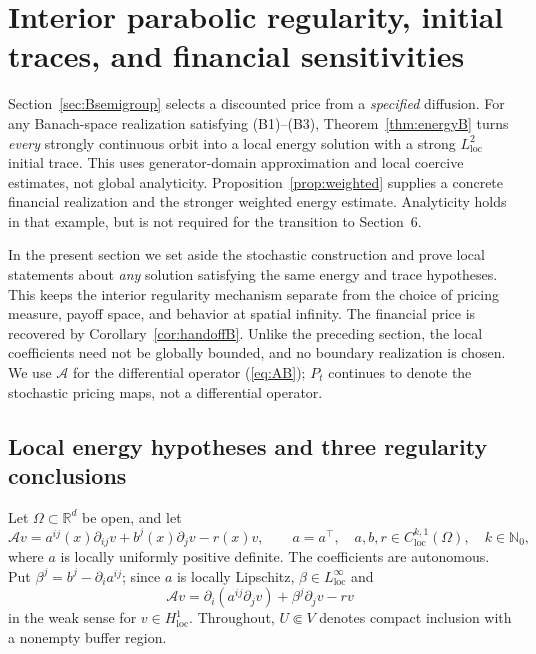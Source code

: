 \documentclass[11pt,a4paper]{article}
\theoremstyle{definition}\newtheorem{definition}{Definition}[section]\newtheorem{example}[theorem]{Example}
\theoremstyle{remark}\newtheorem{remark}[theorem]{Remark}\newtheorem{remarkSix}{Remark}[section]
\newcommand{\Rd}{\mathbb R^d}
\newcommand{\loc}{\mathrm{loc}}
\newcommand{\cA}{\mathcal A}
\begin{document}
\clearpage
\section{Interior parabolic regularity, initial traces, and financial sensitivities}
\label{sec:interior6}

Section~\ref{sec:Bsemigroup} selects a discounted price from a \emph{specified} diffusion. For any Banach-space realization satisfying (B1)--(B3), Theorem~\ref{thm:energyB} turns \emph{every} strongly continuous orbit into a local energy solution with a strong $L^2_{\loc}$ initial trace. This uses generator-domain approximation and local coercive estimates, not global analyticity. Proposition~\ref{prop:weighted} supplies a concrete financial realization and the stronger weighted energy estimate. Analyticity holds in that example, but is not required for the transition to Section~6.

In the present section we set aside the stochastic construction and prove local statements about \emph{any} solution satisfying the same energy and trace hypotheses. This keeps the interior regularity mechanism separate from the choice of pricing measure, payoff space, and behavior at spatial infinity. The financial price is recovered by Corollary~\ref{cor:handoffB}. Unlike the preceding section, the local coefficients need not be globally bounded, and no boundary realization is chosen. We use $\cA$ for the differential operator (\ref{eq:AB}); $P_t$ continues to denote the stochastic pricing maps, not a differential operator.

\subsection{Local energy hypotheses and three regularity conclusions}
\label{subsec:three6}
Let $\Omega\subset\Rd$ be open, and let
\begin{equation}\label{eq:localoperator6}
 \cA v=a^{ij}(x)\partial_{ij}v+b^j(x)\partial_jv-r(x)v,
 \qquad a=a^\top,\quad
 a,b,r\in C^{k,1}_{\loc}(\Omega),\quad k\in\mathbb N_0,
\end{equation}
where $a$ is locally uniformly positive definite. The coefficients are autonomous. Put $\beta^j=b^j-\partial_i a^{ij}$; since $a$ is locally Lipschitz, $\beta\in L^\infty_{\loc}$ and
\begin{equation}\label{eq:div6}
 \cA v=\partial_i(a^{ij}\partial_jv)+\beta^j\partial_jv-rv
\end{equation}
in the weak sense for $v\in H^1_{\loc}$. Throughout, $U\Subset V$ denotes compact inclusion with a nonempty buffer region.
\end{document}
